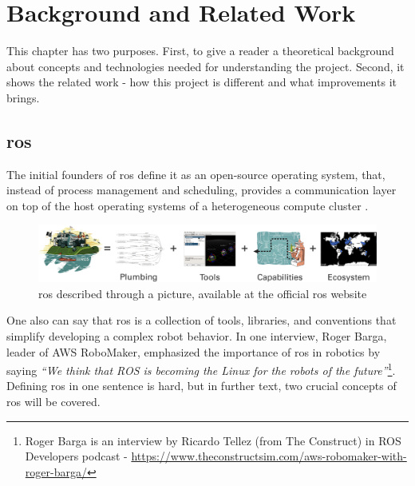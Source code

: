 \chapter{Background and Related Work}
\label{chap:background}

This chapter has two purposes. First, to give a reader a theoretical background about concepts and technologies needed for understanding the project. Second, it shows the related work - how this project is different and what improvements it brings.

\section{\ac{ros}}

The initial founders of \ac{ros} define it as an open-source operating system, that, instead of process management and scheduling, provides a communication layer on top of the host operating systems of a heterogeneous compute cluster \cite{quigley_ros_nodate}.

\begin{figure}[H]
    \centering
    \includegraphics[width=\textwidth]{background/figures/ros_equation.png}
    \caption{\ac{ros} described through a picture, available at the official \ac{ros} website}
    \label{fig:background:ros_equation}
\end{figure}

One also can say that \ac{ros} is a collection of tools, libraries, and conventions that simplify developing a complex robot behavior. In one interview, Roger Barga, leader of AWS RoboMaker, emphasized the importance of \ac{ros} in robotics by saying \textit{``We think that ROS is becoming the Linux for the robots of the future''}\footnote{Roger Barga is an interview by Ricardo Tellez (from The Construct) in ROS Developers podcast -    \url{https://www.theconstructsim.com/aws-robomaker-with-roger-barga/}}. Defining \ac{ros} in one sentence is hard, but in further text, two crucial concepts of \ac{ros} will be covered.

